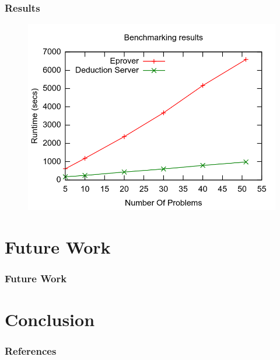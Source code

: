 \documentclass[10pt]{beamer}
\begin{document}
\begin{frame}[fragile]
  \frametitle{Results}
\begin{figure} \includegraphics[width=\linewidth,height=0.9\textheight,keepaspectratio]{imgs/BenchmarkingResults.png} \end{figure}
\end{frame}

\section{Future Work}
\begin{frame}[fragile]
  \frametitle{Future Work}
\end{frame}

\section{Conclusion}
\begin{frame}[fragile]
\end{frame}


\begin{frame}[allowframebreaks]

  \frametitle{References}

  
  

\end{frame}
\end{document}
